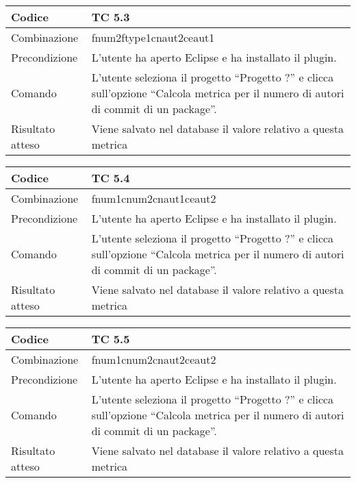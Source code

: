 \begin{table}[ht]
\begin{tabular}{|p{3cm}|p{9cm}|}
\hline
\cellcolor{lightgray}Codice				& TC 5.3								\\
\hline
\cellcolor{lightgray}Combinazione		& fnum2ftype1cnaut2ceaut1								\\
\hline
\cellcolor{lightgray}Precondizione		& L'utente ha aperto Eclipse e ha installato il plugin.					\\
\hline
\cellcolor{lightgray}Comando			& L'utente seleziona il progetto ``Progetto ?''  e clicca sull'opzione ``Calcola metrica per il numero di autori di commit di un package''.	\\
\hline
\cellcolor{lightgray}Risultato atteso	& Viene salvato nel database il valore relativo a questa metrica	\\
\hline
\end{tabular}
\end{table}

\begin{table}[ht]
\begin{tabular}{|p{3cm}|p{9cm}|}
\hline
\cellcolor{lightgray}Codice				& TC 5.4								\\
\hline
\cellcolor{lightgray}Combinazione		& fnum1cnum2cnaut1ceaut2							\\
\hline
\cellcolor{lightgray}Precondizione		& L'utente ha aperto Eclipse e ha installato il plugin.			\\
\hline
\cellcolor{lightgray}Comando			& L'utente seleziona il progetto ``Progetto ?''  e clicca sull'opzione ``Calcola metrica per il numero di autori di commit di un package''.	\\
\hline
\cellcolor{lightgray}Risultato atteso	& Viene salvato nel database il valore relativo a questa metrica	\\
\hline
\end{tabular}
\end{table}

\begin{table}[ht]
\begin{tabular}{|p{3cm}|p{9cm}|}
\hline
\cellcolor{lightgray}Codice				& TC 5.5								\\
\hline
\cellcolor{lightgray}Combinazione		& fnum1cnum2cnaut2ceaut2 									\\
\hline
\cellcolor{lightgray}Precondizione		& L'utente ha aperto Eclipse e ha installato il plugin.			\\
\hline
\cellcolor{lightgray}Comando			& L'utente seleziona il progetto ``Progetto ?''  e clicca sull'opzione ``Calcola metrica per il numero di autori di commit di un package''.	\\
\hline
\cellcolor{lightgray}Risultato atteso	& Viene salvato nel database il valore relativo a questa metrica	\\
\hline
\end{tabular}
\end{table}

